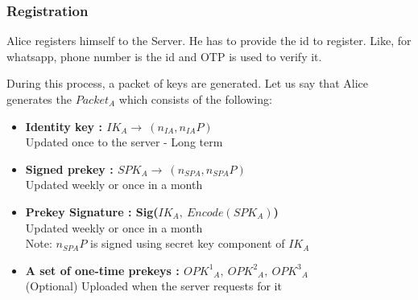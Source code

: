 \documentclass[11pt]{article}
\begin{document}
\subsubsection{Registration}
 Alice registers himself to the Server. He has to provide the id to register. Like, for whatsapp, phone number is the id and OTP is used to verify it.
\begin{center}
        



\end{center}
During this process, a packet of keys are generated. Let us say that Alice generates the  ${Packet}_A$ which consists of the following:
\begin{itemize}
    \item \textbf{Identity key : ${IK}_A \rightarrow \ (n_{IA}, n_{IA}P)$}\\
    Updated once to the server - Long term
    \item \textbf{Signed prekey : ${SPK}_A \rightarrow \ (n_{SPA}, n_{SPA}P)$}\\
    Updated weekly or once in a month
    \item \textbf{Prekey Signature : Sig(${IK}_A,\ Encode({SPK}_A)$)}\\
    Updated weekly or once in a month\\
     Note: $n_{SPA}P$ is signed using secret key component of ${IK}_A$
    \item \textbf{A set of one-time prekeys : ${{OPK}^1}_A,\ {{OPK}^2}_A,\ {{OPK}^3}_A$}\\
    (Optional) Uploaded when the server requests for it
\end{itemize}
\end{document}
